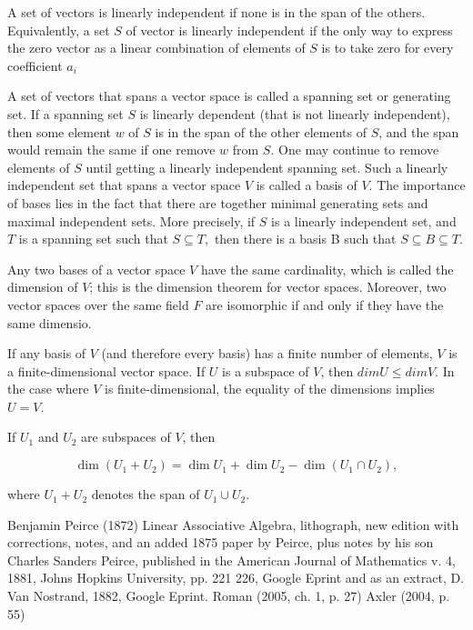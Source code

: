 \documentclass[a4paper,12pt]{article}
\begin{document}
    A set of vectors is linearly independent if none is in the span of the others. Equivalently, a set $S$ of
    vector is linearly independent if the only way to express the zero vector as a linear combination of elements
    of $S$ is to take zero for every coefficient $a_{i}$

    A set of vectors that spans a vector space is called a spanning set or generating set. If a spanning set $S$ is
    linearly dependent (that is not linearly independent), then some element $w$ of $S$ is in the span of
    the other elements of $S$, and the span would remain the same if one remove $w$ from $S$. One may continue
    to remove elements of $S$ until getting a linearly independent spanning set. Such a linearly independent set
    that spans a vector space $V$ is called a basis of $V$. The importance of bases lies in the fact that there are
    together minimal generating sets and maximal independent sets. More precisely, if $S$ is a linearly independent set,
    and $T$ is a spanning set such that $S\subseteq T,$ then there is a basis B such that $S\subseteq B\subseteq T.$

    Any two bases of a vector space $V$ have the same cardinality, which is called the dimension of $V$; this
    is the dimension theorem for vector spaces. Moreover, two vector spaces over the same field $F$ are isomorphic
    if and only if they have the same dimensio.\cite{3}

    If any basis of $V$ (and therefore every basis) has a finite number of elements, $V$ is a finite-dimensional vector
    space. If $U$ is a subspace of $V$, then $dim U \leq dim V$. In the case where $V$ is finite-dimensional, the equality of
    the dimensions implies $U=V$.


    If $U_1$ and $U_2$ are subspaces of $V$, then

    $$\dim(U_{1}+U_{2})=\dim U_{1}+\dim U_{2}-\dim(U_{1}\cap U_{2}),$$

    where $U_{1}+U_{2}$ denotes the span of $ U_{1}\cup U_{2}.$\cite{4}


    \newpage



    \begin{thebibliography}{ 9}

         {
            Benjamin Peirce (1872) Linear Associative Algebra, lithograph, new edition with corrections, notes,
            and an added 1875 paper by Peirce, plus notes by his son Charles Sanders Peirce, published in
            the American Journal of Mathematics v. 4, 1881, Johns Hopkins University, pp. 221 226, Google Eprint}
         {
            and as an extract, D. Van Nostrand, 1882, Google Eprint.}
         {
            Roman (2005, ch. 1, p. 27)}
         {
            Axler (2004, p. 55)}
    \end{thebibliography}
\end{document}
